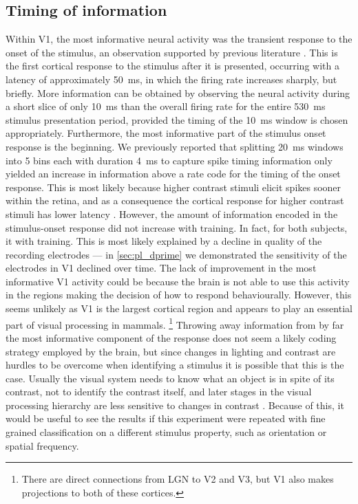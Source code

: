 \subsection{Timing of information}

Within \ac{V1}, the most informative neural activity was the transient response to the onset of the stimulus, an observation supported by previous literature \citep{Muller2001}.
This is the first cortical response to the stimulus after it is presented, occurring with a latency of approximately \SI{50}{\milli\second}, in which the firing rate increases sharply, but briefly.
More information can be obtained by observing the neural activity during a short slice of only \SI{10}{\milli\second} than the overall firing rate for the entire \SI{530}{\milli\second} stimulus presentation period, provided the timing of the \SI{10}{\milli\second} window is chosen appropriately.
Furthermore, the most informative part of the stimulus onset response is the beginning.
We previously reported \citep{Lowe2012} that splitting \SI{20}{\milli\second} windows into \num{5} bins each with duration \SI{4}{\milli\second} to capture spike timing information only yielded an increase in information above a rate code for the timing of the onset response.
This is most likely because higher contrast stimuli elicit spikes sooner within the retina, and as a consequence the cortical response for higher contrast stimuli has lower latency \citep{Albrecht2002}.
However, the amount of information encoded in the stimulus-onset response did not increase with training.
In fact, for both subjects, it  with training.
This is most likely explained by a decline in quality of the recording electrodes --- in \autoref{sec:pl_dprime} we demonstrated the sensitivity of the electrodes in \ac{V1} declined over time.
The lack of improvement in the most informative \ac{V1} activity could be because the brain is not able to use this activity in the regions making the decision of how to respond behaviourally.
However, this seems unlikely as \ac{V1} is the largest cortical region and appears to play an essential part of visual processing in mammals.%
\footnote{There are direct connections from \ac{LGN} to \ac{V2} and \ac{V3}, but \ac{V1} also makes projections to both of these cortices.}
Throwing away information from by far the most informative component of the response does not seem a likely coding strategy employed by the brain, but since changes in lighting and contrast are hurdles to be overcome when identifying a stimulus it is possible that this is the case.
Usually the visual system needs to know what an object is in spite of its contrast, not to identify the contrast itself, and later stages in the visual processing hierarchy are less sensitive to changes in contrast \citep{Sclar1990}.
Because of this, it would be useful to see the results if this experiment were repeated with fine grained classification on a different stimulus property, such as orientation or spatial frequency.

